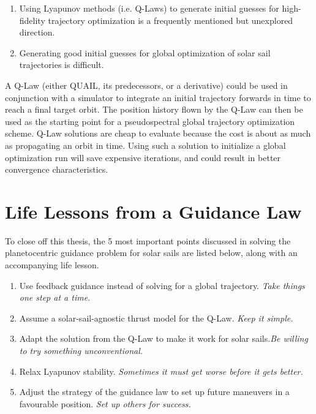 \begin{enumerate}
    \item Using Lyapunov methods (i.e. Q-Laws) to generate initial guesses for high-fidelity trajectory optimization is a frequently mentioned but unexplored direction.
    \item Generating good initial guesses for global optimization of solar sail trajectories is difficult.
\end{enumerate}

A Q-Law (either QUAIL, its predecessors, or a derivative) could be used in conjunction with a simulator to integrate an initial trajectory forwards in time to reach a final target orbit. The position history flown by the Q-Law can then be used as the starting point for a pseudospectral global trajectory optimization scheme. Q-Law solutions are cheap to evaluate because the cost is about as much as propagating an orbit in time. Using such a solution to initialize a global optimization run will save expensive iterations, and could result in better convergence characteristics.

\section{Life Lessons from a Guidance Law}
To close off this thesis, the 5 most important points discussed in solving the planetocentric guidance problem for solar sails are listed below, along with an accompanying life lesson.

\begin{enumerate}
    \item Use feedback guidance instead of solving for a global trajectory. \newline \textit{Take things one step at a time.}
    \item Assume a solar-sail-agnostic thrust model for the Q-Law. \newline \textit{Keep it simple.}
    \item Adapt the solution from the Q-Law to make it work for solar sails.\newline \textit{Be willing to try something unconventional.}
    \item Relax Lyapunov stability. \newline \textit{Sometimes it must get worse before it gets better.}
    \item Adjust the strategy of the guidance law to set up future maneuvers in a favourable position. \newline \textit{Set up others for success.}
\end{enumerate}